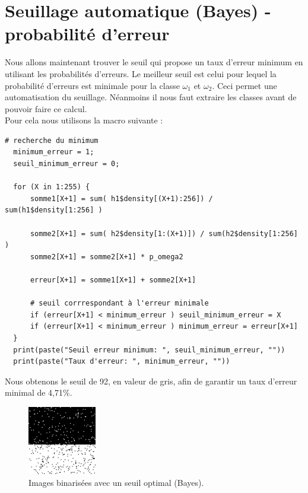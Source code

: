 \documentclass[a4paper,11pt]{article}
\begin{document}
  
  \section{Seuillage automatique (Bayes) - probabilité d’erreur}
  Nous allons maintenant trouver le seuil qui propose un taux d'erreur minimum en utilisant 
  les probabilités d'erreurs. Le meilleur seuil est celui pour lequel la probabilité 
  d'erreurs est minimale pour la classe $\omega_1$ et $\omega_2$. Ceci permet une 
  automatisation du seuillage. Néanmoins il nous faut extraire les classes avant de pouvoir 
  faire ce calcul.\\
  
  Pour cela nous utilisons la macro suivante :
  
  \begin{lstlisting}[caption=Macro qui recherche le seuil avec le taux d'erreur minimum]
  # recherche du minimum
  minimum_erreur = 1;
  seuil_minimum_erreur = 0;

  for (X in 1:255) { 
      somme1[X+1] = sum( h1$density[(X+1):256]) / sum(h1$density[1:256] )
    
      somme2[X+1] = sum( h2$density[1:(X+1)]) / sum(h2$density[1:256] )
      somme2[X+1] = somme2[X+1] * p_omega2

      erreur[X+1] = somme1[X+1] + somme2[X+1]
      
      # seuil corrrespondant à l'erreur minimale
      if (erreur[X+1] < minimum_erreur ) seuil_minimum_erreur = X
      if (erreur[X+1] < minimum_erreur ) minimum_erreur = erreur[X+1]
  }
  print(paste("Seuil erreur minimum: ", seuil_minimum_erreur, ""))
  print(paste("Taux d'erreur: ", minimum_erreur, ""))\end{lstlisting}
  
  Nous obtenons le seuil de 92, en valeur de gris, afin de garantir un taux d'erreur minimal 
  de 4,71\%. 
  
  \begin{figure}[H]
    \center
    \includegraphics[width=3cm]{resultat/binBayes.png}
    \caption{Images binarisées avec un seuil optimal (Bayes).}
  \end{figure}
  
\end{document}
